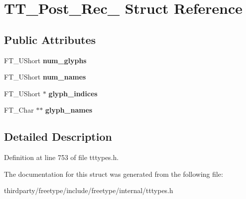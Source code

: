 \hypertarget{struct_t_t___post__20_rec__}{}\section{T\+T\+\_\+\+Post\+\_\+Rec\+\_\+ Struct Reference}
\label{struct_t_t___post__20_rec__}
\subsection*{Public Attributes}
\begin{DoxyCompactItemize}
\item 
\mbox{\label{struct_t_t___post__20_rec___ae3de3677810e6581f2c197e8fa902979}} 
F\+T\+\_\+\+U\+Short {\bfseries num\+\_\+glyphs}
\item 
\mbox{\label{struct_t_t___post__20_rec___af726ff4997521c76de36f76e1203e2b1}} 
F\+T\+\_\+\+U\+Short {\bfseries num\+\_\+names}
\item 
\mbox{\label{struct_t_t___post__20_rec___a7f0a07ab96ccbe2597378f7aa2de3f8c}} 
F\+T\+\_\+\+U\+Short $\ast$ {\bfseries glyph\+\_\+indices}
\item 
\mbox{\label{struct_t_t___post__20_rec___a8330fbc7db3659ac621e98d7ceb8aad3}} 
F\+T\+\_\+\+Char $\ast$$\ast$ {\bfseries glyph\+\_\+names}
\end{DoxyCompactItemize}


\subsection{Detailed Description}


Definition at line 753 of file tttypes.\+h.



The documentation for this struct was generated from the following file\+:\begin{DoxyCompactItemize}
\item 
thirdparty/freetype/include/freetype/internal/tttypes.\+h\end{DoxyCompactItemize}

